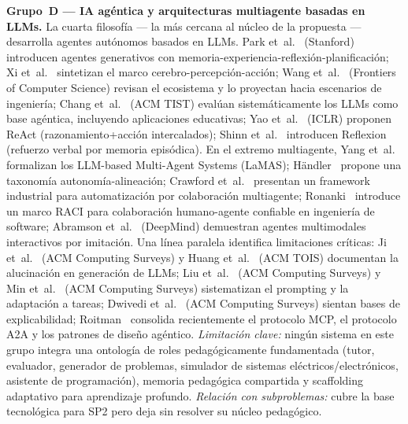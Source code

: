 \textbf{Grupo~D — IA agéntica y arquitecturas multiagente basadas en LLMs.}
La cuarta filosofía — la más cercana al núcleo de la propuesta — desarrolla agentes autónomos basados en LLMs. Park et~al.~\cite{park2023generative} (Stanford) introducen agentes generativos con memoria-experiencia-reflexión-planificación; Xi et~al.~\cite{xi2023rise} sintetizan el marco cerebro-percepción-acción; Wang et~al.~\cite{wang2024survey} (Frontiers of Computer Science) revisan el ecosistema y lo proyectan hacia escenarios de ingeniería; Chang et~al.~\cite{chang2024llmeval} (ACM TIST) evalúan sistemáticamente los LLMs como base agéntica, incluyendo aplicaciones educativas; Yao et~al.~\cite{yao2023react} (ICLR) proponen ReAct (razonamiento+acción intercalados); Shinn et~al.~\cite{shinn2023reflexion} introducen Reflexion (refuerzo verbal por memoria episódica). En el extremo multiagente, Yang et~al.~\cite{yang2024lamas} formalizan los LLM-based Multi-Agent Systems (LaMAS); Händler~\cite{handler2023taxonomy} propone una taxonomía autonomía-alineación; Crawford et~al.~\cite{crawford2024bmw} presentan un framework industrial para automatización por colaboración multiagente; Ronanki~\cite{ronanki2025trust} introduce un marco RACI para colaboración humano-agente confiable en ingeniería de software; Abramson et~al.~\cite{abramson2024mia} (DeepMind) demuestran agentes multimodales interactivos por imitación. Una línea paralela identifica limitaciones críticas: Ji et~al.~\cite{ji2023hallucination} (ACM Computing Surveys) y Huang et~al.~\cite{huang2025hallucination} (ACM TOIS) documentan la alucinación en generación de LLMs; Liu et~al.~\cite{liu2023promptsurvey} (ACM Computing Surveys) y Min et~al.~\cite{min2023plmsurvey} (ACM Computing Surveys) sistematizan el prompting y la adaptación a tareas; Dwivedi et~al.~\cite{dwivedi2023xai} (ACM Computing Surveys) sientan bases de explicabilidad; Roitman~\cite{roitman2026guide} consolida recientemente el protocolo MCP, el protocolo A2A y los patrones de diseño agéntico. \emph{Limitación clave:} ningún sistema en este grupo integra una ontología de roles pedagógicamente fundamentada (tutor, evaluador, generador de problemas, simulador de sistemas eléctricos/electrónicos, asistente de programación), memoria pedagógica compartida y scaffolding adaptativo para aprendizaje profundo. \emph{Relación con subproblemas:} cubre la base tecnológica para SP2 pero deja sin resolver su núcleo pedagógico.

